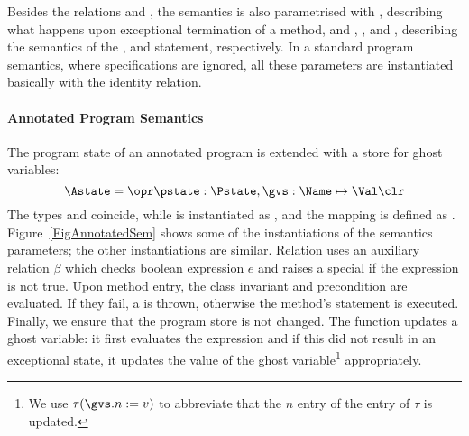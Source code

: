 Besides the relations \gammain and \gammanorm, the semantics
is also parametrised with 
\gammaexc, describing what happens upon exceptional termination of a
method, and \deltaset, \deltacase, and \deltaassert, describing the
semantics of the \Set, \CaseJML and \Assert statement,
respectively. In a standard program semantics, where specifications
are ignored, all these parameters are instantiated basically with the
identity relation. 



\paragraph{Annotated Program Semantics}


The program state of an annotated program is extended with a store for
ghost variables:
\[
\Astate = \opr \pstate : \Pstate, \gvs : \Name \mapsto \Val \clr
\]
The types \FullProgram and \Program coincide, while \FullState is
instantiated as \Astate, and the mapping \progstate is defined as
\pstate. Figure~\ref{FigAnnotatedSem} shows some of the 
instantiations of the semantics parameters; the other instantiations
are similar. Relation \gammain uses an auxiliary relation \(\beta\)
which checks boolean expression \(e\) and raises a special \JMLExc if
the expression is not true. Upon method entry, the class invariant and
precondition are evaluated. If they fail, a \JMLExc is thrown,
otherwise the method's \preset statement is executed. Finally, we
ensure that the program store is not changed. The function
\deltaset updates a ghost variable: it first evaluates the expression
and if this did not result in an exceptional state, it updates the
value of the ghost variable\footnote{We use \(\tau(\gvs.n := v)\) to
abbreviate that the \(n\) entry of the \gvs entry of \(\tau\) is
updated.} appropriately. 

